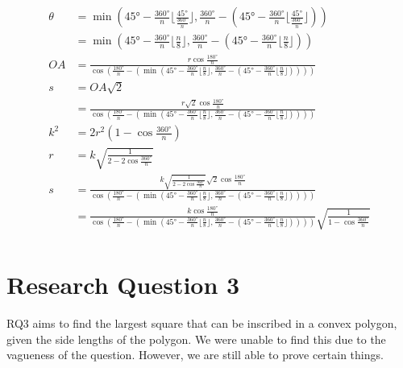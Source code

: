 \documentclass[12pt]{scrartcl}
\begin{document}
\begin{align*}
  \theta & = \min\left(\ang{45} - \frac{\ang{360}}{n}\lfloor \frac{\ang{45}}{\frac{\ang{360}}{n}} \rfloor, \frac{\ang{360}}{n} - \left(\ang{45} - \frac{\ang{360}}{n}\lfloor \frac{\ang{45}}{\frac{\ang{360}}{n}} \rfloor\right)\right)     \\
  & = \min\left(\ang{45} - \frac{\ang{360}}{n}\lfloor \frac{n}{8} \rfloor, \frac{\ang{360}}{n} - \left(\ang{45} - \frac{\ang{360}}{n}\lfloor \frac{n}{8} \rfloor\right)\right)     \\
	OA & = \frac{r \cos \frac{\ang{180}}{n}}{\cos \left(\frac{\ang{180}}{n} - \left(\min\left(\ang{45} - \frac{\ang{360}}{n}\lfloor \frac{n}{8} \rfloor, \frac{\ang{360}}{n} - \left(\ang{45} - \frac{\ang{360}}{n}\lfloor \frac{n}{8} \rfloor\right)\right)\right)\right)}  \\
	s & = OA\sqrt{2} \\
	& = \frac{r \sqrt{2} \cos \frac{\ang{180}}{n}}{\cos \left(\frac{\ang{180}}{n} - \left(\min\left(\ang{45} - \frac{\ang{360}}{n}\lfloor \frac{n}{8} \rfloor, \frac{\ang{360}}{n} - \left(\ang{45} - \frac{\ang{360}}{n}\lfloor \frac{n}{8} \rfloor\right)\right)\right)\right)}  \\
	k^2 & = 2r^2 \left(1 - \cos \frac{\ang{360}}{n}\right)  \\
	r & = k\sqrt{\frac{1}{2 - 2\cos\frac{\ang{360}}{n}}}  \\
	s & = \frac{k\sqrt{\frac{1}{2 - 2\cos\frac{\ang{360}}{n}}} \sqrt{2} \cos \frac{\ang{180}}{n}}{\cos \left(\frac{\ang{180}}{n} - \left(\min\left(\ang{45} - \frac{\ang{360}}{n}\lfloor \frac{n}{8} \rfloor, \frac{\ang{360}}{n} - \left(\ang{45} - \frac{\ang{360}}{n}\lfloor \frac{n}{8} \rfloor\right)\right)\right)\right)}  \\
	& = \frac{k \cos \frac{\ang{180}}{n}}{\cos \left(\frac{\ang{180}}{n} - \left(\min\left(\ang{45} - \frac{\ang{360}}{n}\lfloor \frac{n}{8} \rfloor, \frac{\ang{360}}{n} - \left(\ang{45} - \frac{\ang{360}}{n}\lfloor \frac{n}{8} \rfloor\right)\right)\right)\right)} \sqrt{\frac{1}{1 - \cos\frac{\ang{360}}{n}}} \\
\end{align*}

\section{Research Question 3}
RQ3 aims to find the largest square that can be inscribed in a convex polygon, given the side lengths of the polygon.
We were unable to find this due to the vagueness of the question. However, we are still able to prove certain things.
\end{document}
